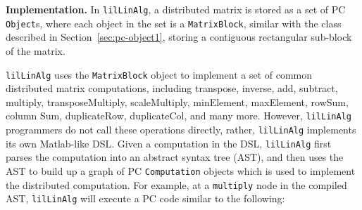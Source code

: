 \vspace{5pt}
\noindent
\textbf{Implementation.} In \texttt{lilLinAlg}, a distributed matrix is stored as a set of PC \texttt{Object}s, where each 
object in the set is a \texttt{MatrixBlock}, similar with the class described in
Section~\ref{sec:pc-object1}, storing a contiguous rectangular sub-block
of the matrix.



\texttt{lilLinAlg} uses the \texttt{MatrixBlock} object to implement a set of common distributed matrix
computations, including transpose,
inverse, add, subtract, multiply, transposeMultiply, 
scaleMultiply, minElement,
maxElement, rowSum, column Sum, duplicateRow, duplicateCol, 
and many more.  However, \texttt{lilLinAlg} programmers do not call these operations directly, rather,
\texttt{lilLinAlg} implements its own Matlab-like DSL.  
Given a computation in the DSL, \texttt{lilLinAlg} first parses the computation into an abstract syntax tree (AST), and then
uses the AST to build up a graph of PC \texttt{Computation} objects which is used to implement the distributed computation.
For example, at a \texttt{multiply} node in the compiled AST, \texttt{lilLinAlg} 
will execute a PC code similar to the following:

